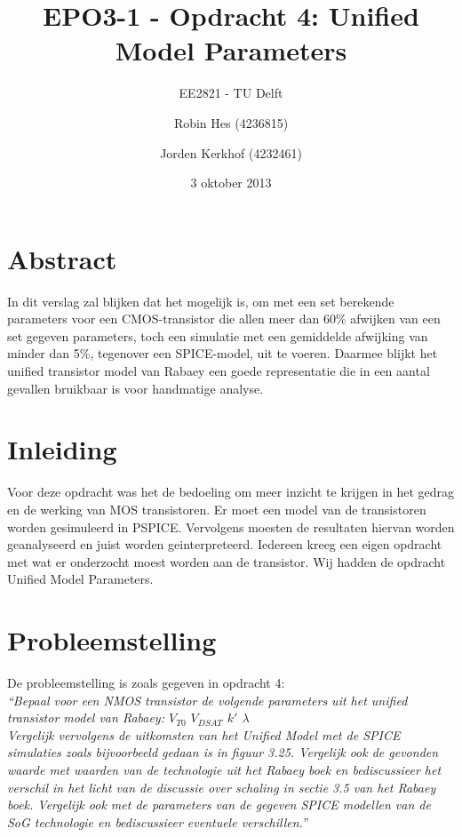 \documentclass{scrartcl}
\author{Robin Hes (4236815) \and Jorden Kerkhof (4232461)}
\title{EPO3-1 - Opdracht 4: Unified Model Parameters}
\subtitle{EE2821 - TU Delft}
\date{3 oktober 2013}
\begin{document}
\maketitle

\section*{Abstract}
In dit verslag zal blijken dat het mogelijk is, om met een set berekende parameters voor een CMOS-transistor die allen meer dan 60\% afwijken van een set gegeven parameters, toch een simulatie met een gemiddelde afwijking van minder dan 5\%, tegenover een SPICE-model, uit te voeren. Daarmee blijkt het unified transistor model van Rabaey een goede representatie die in een aantal gevallen bruikbaar is voor handmatige analyse.

\newpage
\label{sec:ump-abstr}

\tableofcontents

\section{Inleiding}
\label{sec:ump-inl}
Voor deze opdracht was het de bedoeling om meer inzicht te krijgen in het gedrag en de werking van MOS transistoren. Er moet een model van de transistoren worden gesimuleerd in PSPICE. Vervolgens moesten de resultaten hiervan worden geanalyseerd en juist worden geinterpreteerd. Iedereen kreeg een eigen opdracht met wat er onderzocht moest worden aan de transistor. Wij hadden de opdracht Unified Model Parameters.

\newpage
\section{Probleemstelling}
\label{sec:ump-prob}
De probleemstelling is zoals gegeven in opdracht 4: \\
\textit{
``Bepaal voor een NMOS transistor de volgende parameters uit het unified transistor model van Rabaey:
$V_{T0}$ \quad $V_{DSAT}$ \quad $k'$ \quad $\lambda$ \\
Vergelijk vervolgens de uitkomsten van het Unified Model met de SPICE simulaties zoals bijvoorbeeld
gedaan is in figuur 3.25. Vergelijk ook de gevonden waarde met waarden van de technologie uit het Rabaey
boek en bediscussieer het verschil in het licht van de discussie over schaling in sectie 3.5 van het Rabaey
boek. Vergelijk ook met de parameters van de gegeven SPICE modellen van de SoG technologie en bediscussieer
eventuele verschillen.''
}
\cite[4]{epo3-opdracht-4}
\end{document}

